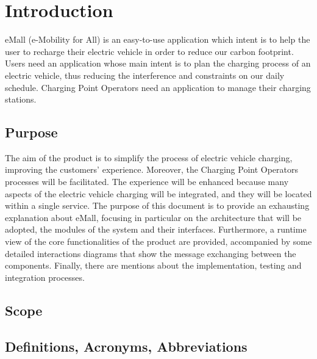 \section{Introduction}
eMall (e-Mobility for All) is an easy-to-use application which intent is to help the user to recharge their electric vehicle in order to reduce our carbon footprint. Users need an application whose main intent is to plan the charging process of an electric vehicle, thus reducing the interference and constraints on our daily schedule. Charging Point Operators need an application to manage their charging stations.
\subsection{Purpose}
The aim of the product is to simplify the process of electric vehicle charging, improving the customers’ experience. Moreover, the Charging Point Operators processes will be facilitated. The experience will be enhanced because many aspects of the electric vehicle charging will be integrated, and they will be located within a single service.\newline
The purpose of this document is to provide an exhausting explanation about eMall, focusing in particular on the architecture that will be adopted, the modules of the system and their interfaces.
Furthermore, a runtime view of the core functionalities of the product are provided, accompanied by some detailed interactions diagrams that show the message exchanging between the components.
Finally, there are mentions about the implementation, testing and integration processes.
\subsection{Scope}
\subsection{Definitions, Acronyms, Abbreviations}
